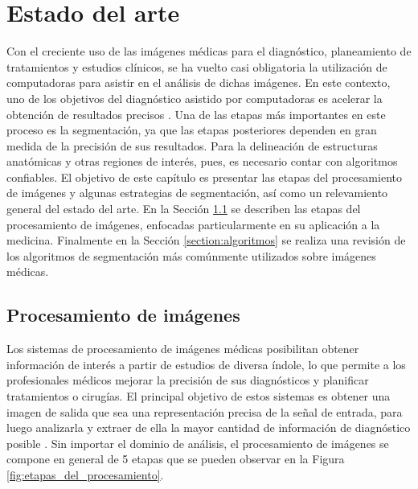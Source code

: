 \chapter{Estado del arte}\label{chapter:estado_del_arte}
Con el creciente uso de las imágenes médicas para el diagnóstico, planeamiento de tratamientos y estudios clínicos, se ha vuelto casi obligatoria la utilización de computadoras para asistir en el análisis de dichas imágenes. En este contexto, uno de los objetivos del diagnóstico asistido por computadoras es acelerar la obtención de resultados precisos \citep{Sharma2010}. Una de las etapas más importantes en este proceso es la segmentación, ya que las etapas posteriores dependen en gran medida de la precisión de sus resultados. Para la delineación de estructuras anatómicas y otras regiones de interés, pues, es necesario contar con algoritmos confiables.
El objetivo de este capítulo es presentar las etapas del procesamiento de imágenes y algunas estrategias de segmentación, así como un relevamiento general del estado del arte. En la Sección \ref{section:procesamiento} se describen las etapas del procesamiento de imágenes, enfocadas particularmente en su aplicación a la medicina. Finalmente en la Sección \ref{section:algoritmos} se realiza una revisión de los algoritmos de segmentación más comúnmente utilizados sobre imágenes médicas.

\section{Procesamiento de imágenes}\label{section:procesamiento}
Los sistemas de procesamiento de imágenes médicas posibilitan obtener información de interés a partir de estudios de diversa índole, lo que permite a los profesionales médicos mejorar la precisión de sus diagnósticos y planificar tratamientos o cirugías. El principal objetivo de estos sistemas es obtener una imagen de salida que sea una representación precisa de la señal de entrada, para luego analizarla y extraer de ella la mayor cantidad de información de diagnóstico posible \citep{dougherty2009digital}. Sin importar el dominio de análisis, el procesamiento de imágenes se compone en general de 5 etapas que se pueden observar en la Figura \ref{fig:etapas_del_procesamiento}.

